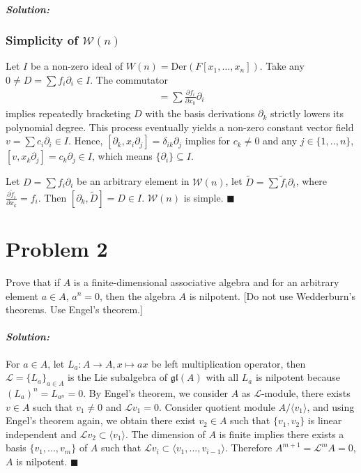 \documentclass[12pt, a4paper]{article}
\newenvironment{solution}
  {\paragraph{\textit{Solution:}}\par\medskip}
  {\hfill$\blacksquare$\vspace{0.1cm}}
\begin{document}
\begin{solution}
\subsubsection*{Simplicity of $\mathcal{W}(n)$}

Let $I$ be a non-zero ideal of $W(n) = \text{Der}(F[x_1, \dots, x_n])$.
Take any $0 \neq D = \sum f_i \partial_i \in I$. The commutator
\begin{align*}
  [\partial_k ,D] = \sum \frac{\partial f_i}{\partial x_k} \partial_{i}
\end{align*}
implies
repeatedly bracketing $D$ with the basis derivations $\partial_k $ strictly lowers its polynomial degree. This process eventually yields a non-zero constant vector field $v = \sum c_i \partial_i \in I$.
Hence, $[\partial_k,x_i\partial_j] = \delta_{ik}\partial_{j}$ implies for $c_k\neq 0$ and any $j\in\{1,..,n\}$, $[v,x_k\partial_j]=c_k\partial_j\in I$, which means
$\{\partial_i\} \subseteq I$. 

Let $D = \sum f_i\partial_i$ be an arbitrary element in $\mathcal{W}(n)$, let $\tilde{D} = \sum \tilde{f}_i \partial_i$, where $\frac{\partial{\tilde{f}_i}}{\partial x_k} = f_i$. Then $[\partial_k,\tilde{D}] = D \in I$. $\mathcal{W}(n)$ is simple.
\end{solution}


\section*{Problem 2}
Prove that if $A$ is a finite-dimensional associative algebra and for an arbitrary element $a \in A$, $a^n = 0$, then the algebra $A$ is nilpotent. [Do not use Wedderburn's theorems. Use Engel's theorem.]
\begin{solution}
  For $a\in A$, let $L_a: A \to A,x \mapsto ax$ be left multiplication operator, then $\mathcal{L} = \{L_a\}_{a\in A}$ is the Lie subalgebra of $\mathfrak{gl}(A)$ with all $L_a$ is nilpotent because $(L_a)^n = L_{a^n} = 0$.
   By Engel's theorem, we consider $A$ as $\mathcal{L}$-module, there exists $v\in A$ such that $v_1\neq 0$ and $\mathcal{L}v_1 =0$. Consider quotient module $A/ \langle v_1 \rangle$, and using Engel's theorem again, we obtain there exist $v_2\in A$ such that $\{v_1,v_2\}$ is linear independent and $\mathcal{L}v_2 \subset \langle v_1 \rangle$. The dimension of $A$ is finite implies 
   there exists a basis $\{v_1,...,v_m\}$ of $A$ such that $\mathcal{L}v_{i} \subset \langle v_1,...,v_{i-1} \rangle$. Therefore $A^{m+1} = \mathcal{L}^{m}A = 0$, $A$ is nilpotent. 
\end{solution}
\end{document}
